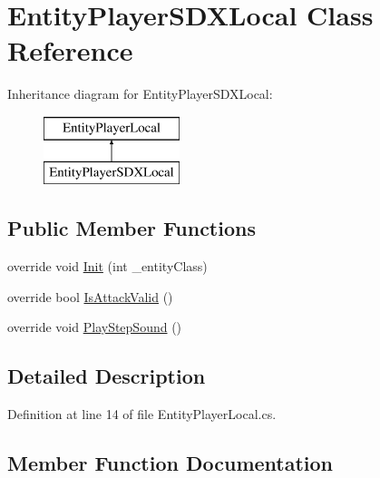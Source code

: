 \hypertarget{class_entity_player_s_d_x_local}{}\section{Entity\+Player\+S\+D\+X\+Local Class Reference}
\label{class_entity_player_s_d_x_local}
Inheritance diagram for Entity\+Player\+S\+D\+X\+Local\+:\begin{figure}[H]
\begin{center}
\leavevmode
\includegraphics[height=2.000000cm]{class_entity_player_s_d_x_local}
\end{center}
\end{figure}
\subsection*{Public Member Functions}
\begin{DoxyCompactItemize}
\item 
override void \mbox{\hyperlink{class_entity_player_s_d_x_local_ad0f75f7aac5777a74ce88d62d1997c89}{Init}} (int \+\_\+entity\+Class)
\item 
override bool \mbox{\hyperlink{class_entity_player_s_d_x_local_a389bd4d43007414092ca71759ccded49}{Is\+Attack\+Valid}} ()
\item 
override void \mbox{\hyperlink{class_entity_player_s_d_x_local_ae9ed4a028520ad3da3f8862ad46de878}{Play\+Step\+Sound}} ()
\end{DoxyCompactItemize}


\subsection{Detailed Description}


Definition at line 14 of file Entity\+Player\+Local.\+cs.



\subsection{Member Function Documentation}
\mbox{\label{class_entity_player_s_d_x_local_ad0f75f7aac5777a74ce88d62d1997c89}} 
